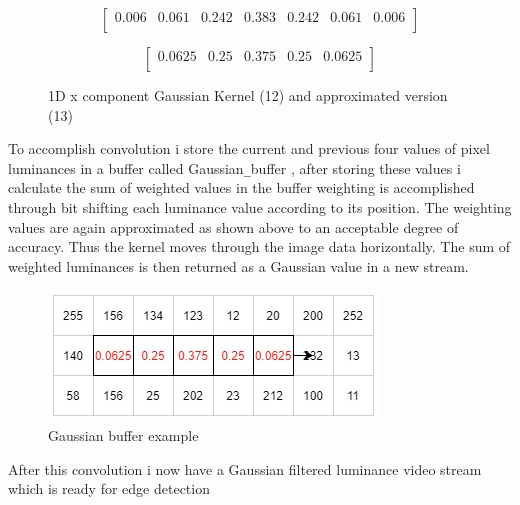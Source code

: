 \documentclass[10pt,twoside]{article}
\begin{document}
\begin{figure}[hbt]
    \begin{minipage}{.55\textwidth}
    \begin{equation}
        \begin{bmatrix}
        0.006 & 0.061 & 0.242 & 0.383 & 0.242  & 0.061  & 0.006 \\
    \end{bmatrix}
    \end{equation}
    \end{minipage}
    \begin{minipage}{.39\textwidth}
    \begin{equation}
        \begin{bmatrix}
        0.0625  & 0.25 & 0.375 & 0.25  & 0.0625 \\
        \end{bmatrix}
    \end{equation}
    \end{minipage}
    \caption{1D x component Gaussian Kernel (12)  and  approximated version (13)}
\end{figure}

To accomplish convolution i store the current and previous four values of pixel luminances in a buffer called Gaussian\verb|_|buffer , after storing these values i calculate the sum of weighted values in the buffer weighting is accomplished through bit shifting each luminance value according to its position. The weighting values are again approximated as shown above to an acceptable degree of accuracy. Thus the kernel moves through the image data horizontally. The sum of weighted luminances is then returned as a Gaussian value in a new stream.

\begin{figure}[hbt]
\includegraphics[scale = 0.55]{GaussianBufferjpg.jpg}
\centering
\caption{Gaussian buffer example}
\label{fig:InitalDesign}
\end{figure}

After this convolution i now have a Gaussian filtered luminance video stream which is ready for edge detection

\newpage
\end{document}
